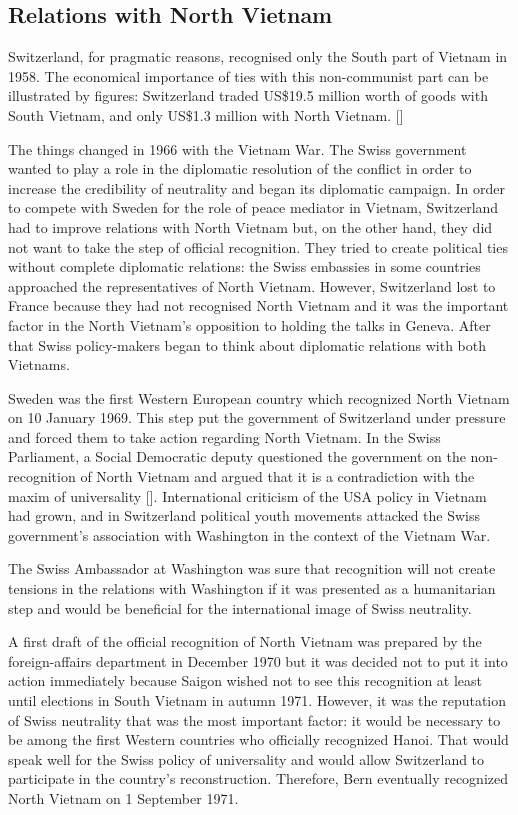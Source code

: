 \documentclass[a4paper]{article}
\begin{document}
\subsection{Relations with North Vietnam}
Switzerland, for pragmatic reasons, recognised only the South part of Vietnam in 1958. The economical importance of ties with this non-communist part can be illustrated by figures: Switzerland traded US\$19.5 million worth of goods with South Vietnam, and only US\$1.3 million with North Vietnam. []

The things changed in 1966 with the Vietnam War. The Swiss government wanted to play a role in the diplomatic resolution of the conflict in order to increase the credibility of neutrality and began its diplomatic campaign. In order to compete with Sweden for the role of peace mediator in Vietnam, Switzerland had to improve relations with North Vietnam but, on the other hand, they did not want to take the step of official recognition. They tried to create political ties without complete diplomatic relations: the Swiss embassies in some countries approached the representatives of North Vietnam. However, Switzerland lost to France because they had not recognised North Vietnam and it was the important factor in the North Vietnam’s opposition to holding the talks in Geneva. After that Swiss policy-makers began to think about diplomatic relations with both Vietnams.

Sweden was the first Western European country which recognized North Vietnam on 10 January 1969. This step put the government of Switzerland under pressure and forced them to take action regarding North Vietnam. In the Swiss Parliament, a Social Democratic deputy questioned the government on the non-recognition of North Vietnam and argued that it is a contradiction with the maxim of universality []. International criticism of the USA policy in Vietnam had grown, and in Switzerland political youth movements attacked the Swiss government's association with Washington in the context of the Vietnam War. 

The Swiss Ambassador at Washington was sure that recognition will not create tensions in the relations with Washington if it was presented as a humanitarian step and would be beneficial for the international image of Swiss neutrality.

A first draft of the official recognition of North Vietnam was prepared by the foreign-affairs department in December 1970 but it was decided not to put it into action immediately because Saigon wished not to see this recognition at least until elections in South Vietnam in autumn 1971. However, it was the reputation of Swiss neutrality that was the most important factor: it would be necessary to be among the first Western countries who officially recognized Hanoi. That would speak well for the Swiss policy of universality and would allow Switzerland to participate in the country's reconstruction. Therefore, Bern eventually recognized North Vietnam on 1 September 1971.
\end{document}
